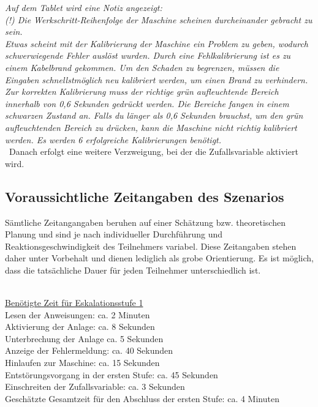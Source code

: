 {\emph{Auf dem Tablet wird eine Notiz angezeigt:} \\

\emph{(!) Die Werkschritt-Reihenfolge der Maschine scheinen durcheinander gebracht zu sein. } \\

\emph{Etwas scheint mit der Kalibrierung der Maschine ein Problem zu geben, wodurch schwerwiegende Fehler auslöst wurden.
                        Durch eine Fehlkalibrierung ist es zu einem Kabelbrand gekommen. Um den Schaden zu begrenzen, müssen die Eingaben schnellstmöglich neu kalibriert werden, um einen Brand zu verhindern.
                        Zur korrekten Kalibrierung muss der richtige grün aufleuchtende Bereich innerhalb von 0,6 Sekunden gedrückt werden. 
                        Die Bereiche fangen in einem schwarzen Zustand an. Falls du länger als 0,6 Sekunden brauchst, 
                        um den grün aufleuchtenden Bereich zu drücken, kann die Maschine nicht richtig kalibriert werden.
                        Es werden 6 erfolgreiche Kalibrierungen benötigt.} \\

\
Danach erfolgt eine weitere Verzweigung, bei der die Zufallsvariable aktiviert wird.

\subsection*{Voraussichtliche Zeitangaben des Szenarios}
Sämtliche Zeitangangaben beruhen auf einer Schätzung bzw. theoretischen Planung und sind je nach individueller Durchführung und Reaktionsgeschwindigkeit des Teilnehmers variabel. Diese Zeitangaben stehen daher unter Vorbehalt und dienen lediglich als grobe Orientierung. Es ist möglich, dass die tatsächliche Dauer für jeden Teilnehmer unterschiedlich ist. \\

\

\underline{Benötigte Zeit für Eskalationsstufe 1} \\
Lesen der Anweisungen: ca. 2 Minuten \\
Aktivierung der Anlage: ca. 8 Sekunden \\
Unterbrechung der Anlage ca. 5 Sekunden \\
Anzeige der Fehlermeldung: ca. 40 Sekunden \\
Hinlaufen zur Maschine: ca. 15 Sekunden \\
Entstörungsvorgang in der ersten Stufe: ca. 45 Sekunden \\
Einschreiten der Zufallsvariable: ca. 3 Sekunden \\
Geschätzte Gesamtzeit für den Abschluss der ersten Stufe: ca. 4 Minuten \\

}

